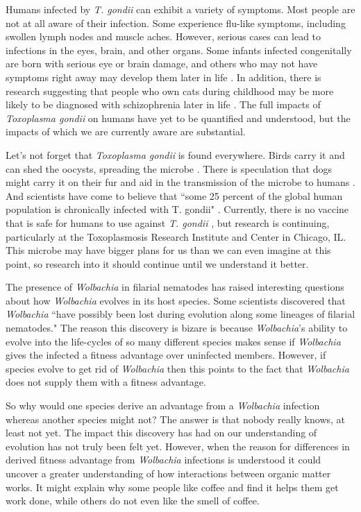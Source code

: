 \documentclass[twocolumn]{article}
\begin{document}
Humans infected by \textit{T. gondii} can exhibit a variety of symptoms. Most people are not at all aware of their infection. Some experience flu-like symptoms, including swollen lymph nodes and muscle aches. However, serious cases can lead to infections in the eyes, brain, and other organs. Some infants infected congenitally are born with serious eye or brain damage, and others who may not have symptoms right away may develop them later in life \cite{Tsymptoms}. In addition, there is research suggesting that people who own cats during childhood may be more likely to be diagnosed with schizophrenia later in life \cite{Tschiz}. The full impacts of \textit{Toxoplasma gondii} on humans have yet to be quantified and understood, but the impacts of which we are currently aware are substantial.

Let’s not forget that \textit{Toxoplasma gondii} is found everywhere. Birds carry it and can shed the oocysts, spreading the microbe \cite{Tbirds}. There is speculation that dogs might carry it on their fur and aid in the transmission of the microbe to humans \cite{Tdogs}. And scientists have come to believe that ``some 25 percent of the global human population is chronically infected with T. gondii" \cite{TUSDA}. Currently, there is no vaccine that is safe for humans to use against \textit{T. gondii} \cite{Tvaccine}, but research is continuing, particularly at the Toxoplasmosis Research Institute and Center in Chicago, IL. This microbe may have bigger plans for us than we can even imagine at this point, so research into it should continue until we understand it better.

The presence of \textit{Wolbachia} in filarial nematodes has raised interesting questions about how \textit{Wolbachia} evolves in its host species. Some scientists discovered that \textit{Wolbachia} ``have possibly been lost during evolution along some lineages of filarial nematodes."\cite{Wevolution_loss} The reason this discovery is bizare is because \textit{Wolbachia}'s ability to evolve into the life-cycles of so many different species makes sense if \textit{Wolbachia} gives the infected a fitness advantage over uninfected members. However, if species evolve to get rid of \textit{Wolbachia} then this points to the fact that \textit{Wolbachia} does not supply them with a fitness advantage.

So why would one species derive an advantage from a \textit{Wolbachia} infection whereas another species might not? The answer is that nobody really knows, at least not yet. The impact this discovery has had on our understanding of evolution has not truly been felt yet. However, when the reason for differences in derived fitness advantage from \textit{Wolbachia} infections is understood it could uncover a greater understanding of how interactions between organic matter works. It might explain why some people like coffee and find it helps them get work done, while others do not even like the smell of coffee.
\end{document}
